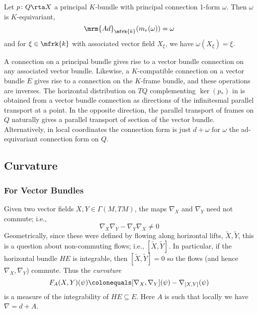 \begin{lem}\label{connection 1-form equivariant}
Let $p\colon Q\rta X$ a principal $K$-bundle with principal connection 1-form $\omega$. 
Then $\omega$ is $K$-equivariant,
\[\mrm{Ad}_\mfrk{k}(m_r(\omega))=\omega\]
and for $\xi\in\mfrk{k}$ with associated vector field $X_\xi$, we have $\omega(X_\xi)=\xi$. 
\end{lem}

\begin{rmk}
A connection on a principal bundle gives rise to a vector bundle connection on any associated vector bundle. 
Likewise, a $K$-compatible connection on a vector bundle $E$ gives rise to a connection on the $K$-frame bundle, 
and these operations are inverses. 
The horizontal distribution on $TQ$ complementing $\ker(p_*)$ in  
is obtained from a vector bundle connection as directions of the infinitesmal parallel transport at a point. 
In the opposite direction, the parallel transport of frames on $Q$ naturally gives a parallel transport of section of the vector bundle. 
Alternatively, in local coordinates the connection form is just $d+\omega$ for $\omega$ the ad-equivariant connection form on $Q$.
\end{rmk}


\subsection{Curvature}

\subsubsection{For Vector Bundles} 

Given two vector fields $X,Y\in\Gamma(M,TM)$, 
the maps $\nabla_X$ and $\nabla_Y$ need not commute; i.e.,
\[\nabla_X\nabla_Y-\nabla_Y\nabla_X\neq 0\]
Geometrically, since these were defined by flowing along horizontal lifts, $\tilde{X},\tilde{Y}$, this is a question about non-commuting flows; i.e., $[\tilde{X},\tilde{Y}]$. 
In particular, if the horizontal bundle $HE$ is integrable, then $[\tilde{X},\tilde{Y}]=0$ so the flows (and hence $\nabla_X,\nabla_Y$) commute. Thus the \emph{curvature} 
\[
	F_A(X,Y)(\psi)\colonequals[\nabla_X,\nabla_Y](\psi)-\nabla_{[X,Y]}(\psi)
\]
is a measure of the integrability of $HE\subseteq E$. 
Here $A$ is such that locally we have $\nabla=d+A$. 


